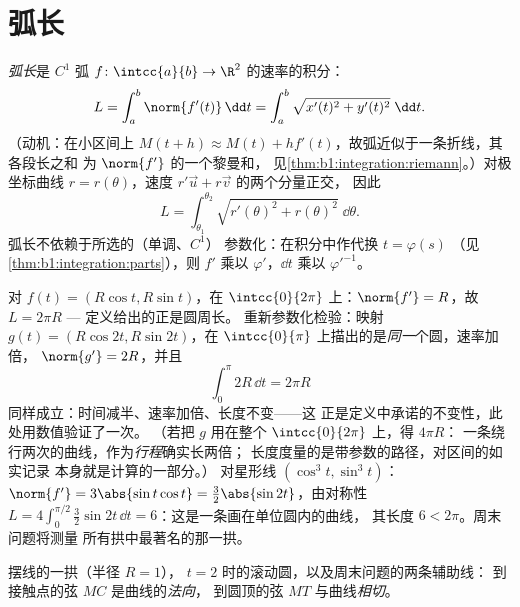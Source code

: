 \section{弧长}

\begin{definition}[弧长]\label{def:b1:curves:arclength}
\emph{弧长}是 $C^1$ 弧 $f \colon
\intcc{a}{b} \to \R^2$ 的速率的积分：
\[
L = \int_a^b \norm{f'(t)}\,\dd t
= \int_a^b \sqrt{x'(t)^2 + y'(t)^2}\;\dd t .
\]
（动机：在小区间上 $M(t + h) \approx M(t) + h
f'(t)$，故弧近似于一条折线，其各段长之和
为 $\norm{f'}$ 的一个黎曼和，
见\cref{thm:b1:integration:riemann}。）对极坐标曲线 $r =
r(\theta)$，速度 $r'\vec u + r\vec v$ 的两个分量正交，
因此
\[
L = \int_{\theta_1}^{\theta_2}
\sqrt{r'(\theta)^2 + r(\theta)^2}\;\dd\theta .
\]
弧长不依赖于所选的（单调、$C^1$）
参数化：在积分中作代换 $t = \varphi(s)$
（见\cref{thm:b1:integration:parts}），则 $f'$ 乘以
$\varphi'$，$\dd t$ 乘以 $\varphi'^{-1}$。
\end{definition}

\begin{example}[检验：圆]\label{ex:b1:curves:circlelength}
对 $f(t) = (R\cos t, R\sin t)$，在 $\intcc{0}{2\pi}$ 上：$\norm{f'} =
R$，故 $L = 2\pi R$ --- 定义给出的正是圆周长。
重新参数化检验：映射 $g(t) = (R\cos 2t, R\sin 2t)$，在
$\intcc{0}{\pi}$ 上描出的是\emph{同一}个圆，速率加倍，
$\norm{g'} = 2R$，并且
\[
\int_0^{\pi} 2R\,\dd t = 2\pi R
\]
同样成立：时间减半、速率加倍、长度不变——这
正是定义中承诺的不变性，此处用数值验证了一次。
（若把 $g$ 用在整个 $\intcc{0}{2\pi}$ 上，得 $4\pi R$：
一条绕行两次的曲线，作为\emph{行程}确实长两倍；
长度度量的是带参数的路径，对区间的如实记录
本身就是计算的一部分。）
对星形线 $(\cos^3t, \sin^3t)$：$\norm{f'} = 3\abs{\sin
t\cos t} = \tfrac32\abs{\sin 2t}$，由对称性 $L = 4\int_0^{\pi/2}
\tfrac32\sin 2t\,\dd t = 6$：这是一条画在单位圆内的曲线，
其长度 $6 < 2\pi$。周末问题将测量
所有拱中最著名的那一拱。
\end{example}

\begin{omfigure}

{\small 摆线的一拱（半径 $R = 1$），
$t = 2$ 时的滚动圆，以及周末问题的两条辅助线：
到接触点的弦 $MC$ 是曲线的\emph{法向}，
到圆顶的弦 $MT$ 与曲线\emph{相切}。}
\end{omfigure}

